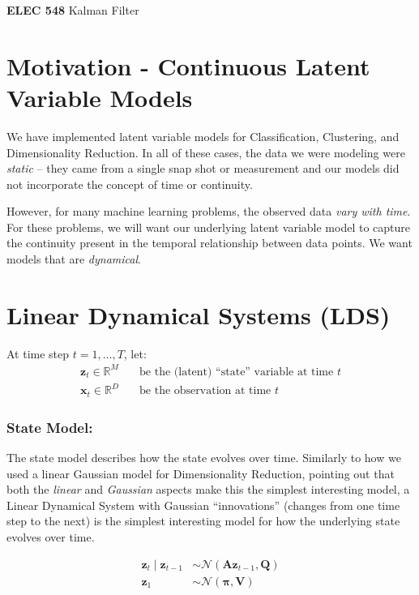 \documentclass[11pt]{article}
\newcommand{\xb}{\mathbf{x}}
\newcommand{\zb}{\mathbf{z}}
\newcommand{\Ab}{\mathbf{A}}
\newcommand{\Qb}{\mathbf{Q}}
\begin{document}
\setmainfont{Myriad Pro} %

\begin{center}
\large
\textbf{ELEC 548} Kalman Filter
\end{center}

\section{Motivation - Continuous Latent Variable Models}
We have implemented latent variable models for Classification, Clustering, and
Dimensionality Reduction. In all of these cases, the data we were modeling were
\textit{static} -- they came from a single snap shot or measurement and our
models did not incorporate the concept of time or continuity.

However, for many machine learning problems, the observed data \textit{vary with
time}. For these problems, we will want our underlying latent variable model to
capture the continuity present in the temporal relationship between data points.
We want models that are \textit{dynamical}.

\section{Linear Dynamical Systems (LDS)}
At time step $t=1, \ldots, T$, let:
\begin{align*}
  \zb_t \in \mathbb{R}^M \quad & \text{be the (latent) ``state'' variable at time $t$} \\
  \xb_t \in \mathbb{R}^D \quad & \text{be the observation at time $t$}
\end{align*}

\subsubsection*{State Model:}
The state model describes how the state evolves over time. Similarly to how we
used a linear Gaussian model for Dimensionality Reduction, pointing out that
both the \textit{linear} and \textit{Gaussian} aspects make this the simplest
interesting model, a Linear Dynamical System with Gaussian ``innovations''
(changes from one time step to the next) is the simplest interesting model for
how the underlying state evolves over time.

\begin{equation}
  \begin{aligned}
    \zb_t \mid \zb_{t-1} &\sim \mathcal{N}(\Ab \zb_{t-1}, \Qb) \\
    \zb_1 &\sim \mathcal{N}(\symbf{\pi}, \mathbf{V})
  \end{aligned}
  \label{eqn:dynamics}
\end{equation}
\end{document}
